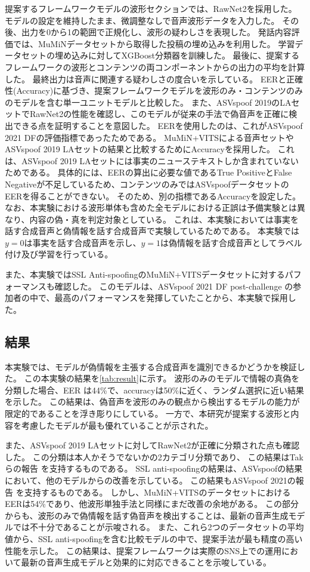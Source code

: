 提案するフレームワークモデルの波形セクションでは、RawNet2を採用した。
モデルの設定を維持したまま、微調整なしで音声波形データを入力した。
その後、出力を0から1の範囲で正規化し、波形の疑わしさを表現した。
発話内容評価では、MuMiNデータセットから取得した投稿の埋め込みを利用した。
学習データセットの埋め込みに対してXGBoost分類器を訓練した。
最後に、提案するフレームワークの波形とコンテンツの両コンポーネントからの出力の平均を計算した。
最終出力は音声に関連する疑わしさの度合いを示している。
EERと正確性(Accuracy)に基づき、提案フレームワークモデルを波形のみ・コンテンツのみのモデルを含む単一ユニットモデルと比較した。 
また、ASVspoof 2019のLAセットでRawNet2の性能を確認し、このモデルが従来の手法で偽音声を正確に検出できる点を証明することを意図した。
EERを使用したのは、これがASVspoof 2021 DFの評価指標であったためである。
MuMiN+VITSによる音声セットやASVspoof 2019 LAセットの結果と比較するためにAccuracyを採用した。
これは、ASVspoof 2019 LAセットには事実のニューステキストしか含まれていないためである。
具体的には、EERの算出に必要な値であるTrue PositiveとFalse Negativeが不足しているため、コンテンツのみではASVspoofデータセットのEERを得ることができない。
そのため、別の指標であるAccuracyを設定した。
なお、本実験における波形単体も含めた全モデルにおける正誤は予備実験とは異なり、内容の偽・真を判定対象としている。
これは、本実験においては事実を話す合成音声と偽情報を話す合成音声で実験しているためである。
本実験では$y=0$は事実を話す合成音声を示し、$y=1$は偽情報を話す合成音声としてラベル付け及び学習を行っている。

また、本実験ではSSL Anti-spoofingのMuMiN+VITSデータセットに対するパフォーマンスも確認した。
このモデルは、ASVspoof 2021 DF post-challenge \cite{10155166}の参加者の中で、最高のパフォーマンスを発揮していたことから、本実験で採用した。

\subsection{結果}\label{sec:cnt_res}
本実験では、モデルが偽情報を主張する合成音声を識別できるかどうかを検証した。
この本実験の結果を\ref{tab:result}に示す。
波形のみのモデルで情報の真偽を分類した場合、EER は44\%で、accuracyは50\%に近く、ランダム選択に近い結果を示した。
この結果は、偽音声を波形のみの観点から検出するモデルの能力が限定的であることを浮き彫りにしている。
一方で、本研究が提案する波形と内容を考慮したモデルが最も優れていることが示された。

また、ASVspoof 2019 LAセットに対してRawNet2が正確に分類された点も確認した。
この分類は本人かそうでないかの2カテゴリ分類であり、
この結果はTakらの報告 \cite{9414234}を支持するものである。
SSL anti-spoofingの結果は、ASVspoofの結果において、他のモデルからの改善を示している。
この結果もASVspoof 2021の報告 \cite{10155166}を支持するものである。
しかし、MuMiN+VITSのデータセットにおけるEERは54\%であり、他波形単独手法と同様にまだ改善の余地がある。
この部分からも、波形のみで偽情報を話す偽音声を検出することは、最新の音声生成モデルでは不十分であることが示唆される。
また、これら2つのデータセットの平均値から、SSL anti-spoofingを含む比較モデルの中で、提案手法が最も精度の高い性能を示した。
この結果は、提案フレームワークは実際のSNS上での運用において最新の音声生成モデルと効果的に対応できることを示唆している。

